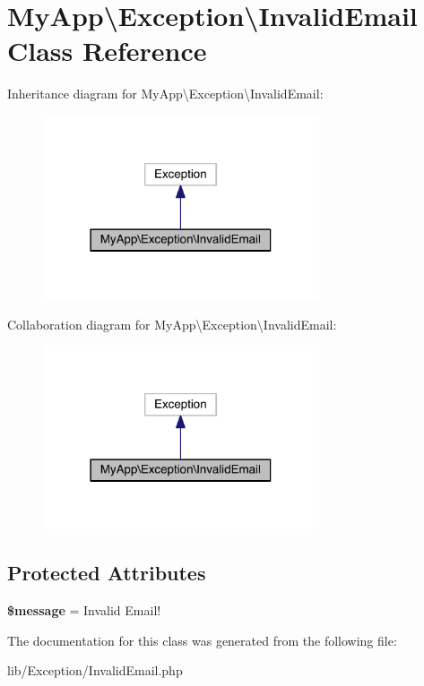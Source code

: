 \hypertarget{class_my_app_1_1_exception_1_1_invalid_email}{}\section{My\+App\textbackslash{}Exception\textbackslash{}Invalid\+Email Class Reference}
\label{class_my_app_1_1_exception_1_1_invalid_email}


Inheritance diagram for My\+App\textbackslash{}Exception\textbackslash{}Invalid\+Email\+:
\nopagebreak
\begin{figure}[H]
\begin{center}
\leavevmode
\includegraphics[width=231pt]{class_my_app_1_1_exception_1_1_invalid_email__inherit__graph}
\end{center}
\end{figure}


Collaboration diagram for My\+App\textbackslash{}Exception\textbackslash{}Invalid\+Email\+:
\nopagebreak
\begin{figure}[H]
\begin{center}
\leavevmode
\includegraphics[width=231pt]{class_my_app_1_1_exception_1_1_invalid_email__coll__graph}
\end{center}
\end{figure}
\subsection*{Protected Attributes}
\begin{DoxyCompactItemize}
\item 
{\bfseries \$message} = \textquotesingle{}Invalid Email!\textquotesingle{}\hypertarget{class_my_app_1_1_exception_1_1_invalid_email_a555474638aaec584514e6a8f305787ab}{}\label{class_my_app_1_1_exception_1_1_invalid_email_a555474638aaec584514e6a8f305787ab}

\end{DoxyCompactItemize}


The documentation for this class was generated from the following file\+:\begin{DoxyCompactItemize}
\item 
lib/\+Exception/Invalid\+Email.\+php\end{DoxyCompactItemize}
